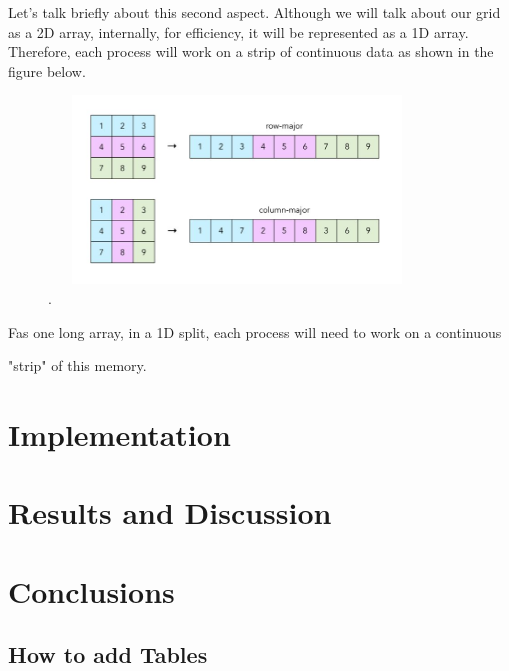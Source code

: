 \documentclass{report}
\begin{document}
Let's talk briefly about this second aspect. Although we will talk about our 
grid as a 2D array, internally, for efficiency, it will be represented as a 1D 
array. Therefore, each process will work on a strip of continuous data as 
shown in the figure below. 

\begin{figure}[h]
\centering
\includegraphics[width=10cm, height=5cm]{./other_images/arraydecomposition.jpg}
\caption{\label{fig:decomposition}.}
\end{figure}


Fas one long array, in a 1D split, each process will need to work on a continuous


"strip" of this memory. 



\section{Implementation}

\section{Results and Discussion}

\section{Conclusions}

\subsection{How to add Tables}
\end{document}
